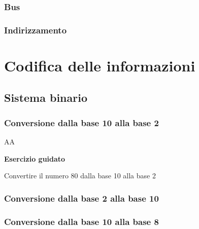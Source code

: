 \documentclass[11pt,fleqn]{book}
\begin{document}
\section{Bus}

\section{Indirizzamento}



\part{Codifica delle informazioni}



\chapter{Sistema binario}

\section{Conversione dalla base 10 alla base 2}
AA
\lipsum[1-7]

\begin{esercizio}[1]
    \textbf{Esercizio guidato}

    Convertire il numero 80 dalla base 10 alla base 2

    \lipsum[1]
\end{esercizio}


% 

\section{Conversione dalla base 2 alla base 10}

\section{Conversione dalla base 10 alla base 8}
\end{document}
